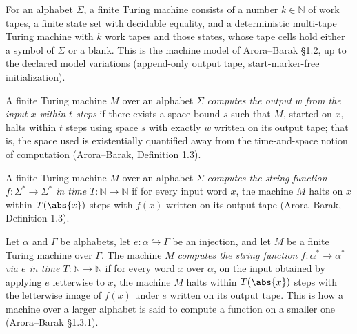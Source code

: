 \begin{definition}
\label{Turing.FinTM}
\leanok
{}
For an alphabet $\Sigma$, a finite Turing machine consists of a number
$k \in \mathbb{N}$ of work tapes, a finite state set with decidable equality,
and a deterministic multi-tape Turing machine with $k$ work tapes and those
states, whose tape cells hold either a symbol of $\Sigma$ or a blank.  This is
the machine model of Arora--Barak \S 1.2, up to the declared model variations
(append-only output tape, start-marker-free initialization).
\end{definition}

\begin{definition}
\label{Turing.FinTM.ComputesInTime}
\leanok
{}
A finite Turing machine $M$ over an alphabet $\Sigma$ \emph{computes the
output $w$ from the input $x$ within $t$ steps} if there exists a space bound
$s$ such that $M$, started on $x$, halts within $t$ steps using space $s$ with
exactly $w$ written on its output tape; that is, the space used is
existentially quantified away from the time-and-space notion of computation
(Arora--Barak, Definition 1.3).
\end{definition}

\begin{definition}
\label{Turing.FinTM.ComputesFunInTime}
\leanok
{}
A finite Turing machine $M$ over an alphabet $\Sigma$ \emph{computes the
string function $f \colon \Sigma^{*} \to \Sigma^{*}$ in time
$T \colon \mathbb{N} \to \mathbb{N}$} if for every input word $x$, the machine
$M$ halts on $x$ within $T(\abs{x})$ steps with $f(x)$ written on its output
tape (Arora--Barak, Definition 1.3).
\end{definition}

\begin{definition}
\label{Turing.FinTM.ComputesFunInTimeVia}
\leanok
{}
Let $\alpha$ and $\Gamma$ be alphabets, let $e \colon \alpha \hookrightarrow
\Gamma$ be an injection, and let $M$ be a finite Turing machine over $\Gamma$.
The machine $M$ \emph{computes the string function $f \colon \alpha^{*} \to
\alpha^{*}$ via $e$ in time $T \colon \mathbb{N} \to \mathbb{N}$} if for every
word $x$ over $\alpha$, on the input obtained by applying $e$ letterwise to
$x$, the machine $M$ halts within $T(\abs{x})$ steps with the letterwise image
of $f(x)$ under $e$ written on its output tape.  This is how a machine over a
larger alphabet is said to compute a function on a smaller one
(Arora--Barak \S 1.3.1).
\end{definition}

